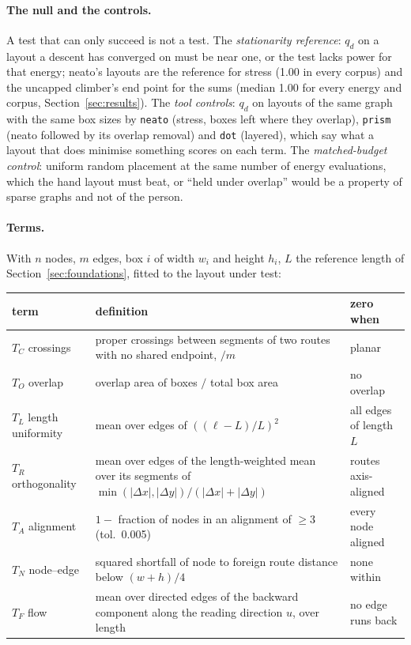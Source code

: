 \documentclass[11pt]{article}
\begin{document}
\paragraph{The null and the controls.} A test that can only succeed is not a test. The
\emph{stationarity reference}: $q_d$ on a layout a descent has converged on must be near
one, or the test lacks power for that energy; neato's layouts are the reference for stress
(1.00 in every corpus) and the uncapped climber's end point for the sums (median 1.00 for
every energy and corpus, Section~\ref{sec:results}). The \emph{tool controls}: $q_d$ on layouts of the same graph with the same box
sizes by \texttt{neato} (stress, boxes left where they overlap), \texttt{prism} (neato
followed by its overlap removal) and \texttt{dot} (layered), which say what a layout that
does minimise something scores on each term. The \emph{matched-budget control}: uniform
random placement at the same number of energy evaluations, which the hand layout must beat,
or ``held under overlap'' would be a property of sparse graphs and not of the person.

\paragraph{Terms.} With $n$ nodes, $m$ edges, box $i$ of width $w_i$ and height $h_i$, $L$
the reference length of Section~\ref{sec:foundations}, fitted to the layout under test:

\begin{center}\footnotesize
\begin{tabular}{lp{8.2cm}l}
\toprule
term & definition & zero when \\
\midrule
$T_C$ crossings & proper crossings between segments of two routes with no shared endpoint, $/m$ & planar \\
$T_O$ overlap & overlap area of boxes $/$ total box area & no overlap \\
$T_L$ length uniformity & mean over edges of $((\ell - L)/L)^2$ & all edges of length $L$ \\
$T_R$ orthogonality & mean over edges of the length-weighted mean over its segments of $\min(|\Delta x|,|\Delta y|)/(|\Delta x|+|\Delta y|)$ & routes axis-aligned \\
$T_A$ alignment & $1 -$ fraction of nodes in an alignment of $\ge 3$ (tol.\ 0.005) & every node aligned \\
$T_N$ node--edge & squared shortfall of node to foreign route distance below $(w+h)/4$ & none within \\
$T_F$ flow & mean over directed edges of the backward component along the reading direction $u$, over length & no edge runs back \\
\bottomrule
\end{tabular}
\end{center}
\end{document}
